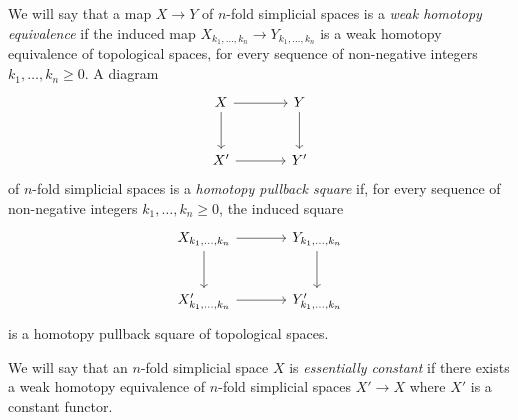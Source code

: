 \documentclass[a4paper,11pt]{article}
\theoremstyle{plain}
\theoremstyle{definition}
\theoremstyle{remark}
\begin{document}
We will say that a map $X \to Y$ of $n$-fold simplicial spaces is a \textit{weak homotopy equivalence} if the induced map $X_{k_1, \dots , k_n} \to Y_{k_1, \dots , k_n}$ is a weak homotopy equivalence of topological spaces, for every sequence of non-negative integers $k_1, \dots , k_n \geq 0$. A diagram 
\begin{equation*}
    \begin{tikzcd}[row sep = large, column sep = large]
    X \arrow[r] \arrow[d] & Y \arrow[d]\\
    X' \arrow[r] & Y'
    \end{tikzcd}
\end{equation*}
of $n$-fold simplicial spaces is a \textit{homotopy pullback square} if, for every sequence of non-negative integers $k_1, \dots , k_n \geq 0$, the induced square 
\begin{equation*}
    \begin{tikzcd}[row sep = large, column sep = large]
    X_{k_1, \dots , k_n} \arrow[r] \arrow[d] & Y_{k_1, \dots , k_n}\arrow[d]\\
    X'_{k_1, \dots , k_n} \arrow[r] & Y'_{k_1, \dots , k_n}
    \end{tikzcd}
\end{equation*}
is a homotopy pullback square of topological spaces.

We will say that an $n$-fold simplicial space $X$ is \textit{essentially constant} if there exists a weak homotopy equivalence of $n$-fold simplicial spaces $X' \to X$ where $X'$ is a constant functor. 
\end{document}
